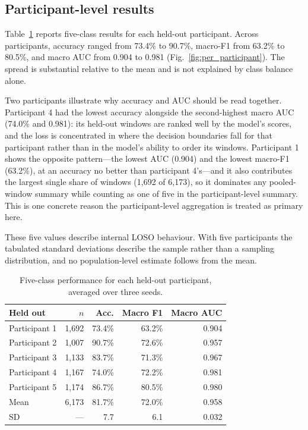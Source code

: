 \documentclass[pdflatex,sn-nature,iicol]{sn-jnl}
\begin{document}
\subsection{Participant-level results}

Table~\ref{tab:persubject} reports five-class results for each held-out participant. Across participants, accuracy ranged from 73.4\% to 90.7\%, macro-F1 from 63.2\% to 80.5\%, and macro AUC from 0.904 to 0.981 (Fig.~\ref{fig:per_participant}). The spread is substantial relative to the mean and is not explained by class balance alone.

Two participants illustrate why accuracy and AUC should be read together. Participant 4 had the lowest accuracy alongside the second-highest macro AUC (74.0\% and 0.981): its held-out windows are ranked well by the model's scores, and the loss is concentrated in where the decision boundaries fall for that participant rather than in the model's ability to order its windows. Participant 1 shows the opposite pattern---the lowest AUC (0.904) and the lowest macro-F1 (63.2\%), at an accuracy no better than participant 4's---and it also contributes the largest single share of windows (1,692 of 6,173), so it dominates any pooled-window summary while counting as one of five in the participant-level summary. This is one concrete reason the participant-level aggregation is treated as primary here.

These five values describe internal LOSO behaviour. With five participants the tabulated standard deviations describe the sample rather than a sampling distribution, and no population-level estimate follows from the mean.

\begin{table}[h]
  \caption{Five-class performance for each held-out participant, averaged over three seeds.}
  \label{tab:persubject}
  \centering
  \footnotesize
  \begin{tabular*}{\columnwidth}{@{\extracolsep{\fill}}lrrrr@{}}
    \toprule
    Held out & $n$ & Acc. & Macro F1 & Macro AUC \\
    \midrule
    Participant 1 & 1,692 & 73.4\% & 63.2\% & 0.904 \\
    Participant 2 & 1,007 & 90.7\% & 72.6\% & 0.957 \\
    Participant 3 & 1,133 & 83.7\% & 71.3\% & 0.967 \\
    Participant 4 & 1,167 & 74.0\% & 72.2\% & 0.981 \\
    Participant 5 & 1,174 & 86.7\% & 80.5\% & 0.980 \\
    \midrule
    Mean & 6,173 & 81.7\% & 72.0\% & 0.958 \\
    SD & --- & 7.7 & 6.1 & 0.032 \\
    \bottomrule
  \end{tabular*}
\end{table}
\end{document}
